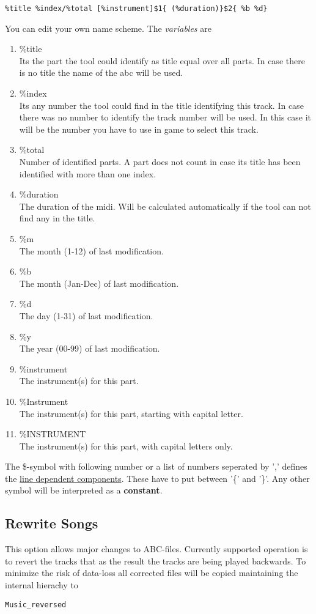 \documentclass[10pt,a4paper,oneside]{article}
\begin{document}
\begin{verbatim}
%title %index/%total [%instrument]$1{ (%duration)}$2{ %b %d}
\end{verbatim} You can edit your own name scheme. The \textit{variables} are \begin{enumerate}
\item[] \%title \\ Its the part the tool could identify as title equal over all parts. In case there is no title the name of the abc will be used.
\item[] \%index \\ Its any number the tool could find in the title identifying this track. In case there was no number to identify the track number will be used. In this case it will be the number you have to use in game to select this track.
\item[] \%total \\ Number of identified parts. A part does not count in case its title has been identified with more than one index.
\item[] \%duration \\ The duration of the midi. Will be calculated automatically if the tool can not find any in the title.
\item[] \%m \\ The month (1-12) of last modification.
\item[] \%b \\ The month (Jan-Dec) of last modification.
\item[] \%d \\ The day (1-31) of last modification.
\item[] \%y \\ The year (00-99) of last modification.
\item[] \%instrument \\ The instrument(s) for this part.
\item[] \%Instrument \\ The instrument(s) for this part, starting with capital letter.
\item[] \%INSTRUMENT \\ The instrument(s) for this part, with capital letters only.
\end{enumerate} The \$-symbol with following number or a list of numbers seperated by ',' defines the \underline{line dependent components}. These have to put between '\{' and '\}'. Any other symbol will be interpreted as a \textbf{constant}.

\subsection{Rewrite Songs}
This option allows major changes to ABC-files. Currently supported operation is to revert the tracks that as the result the tracks are being played backwards. To minimize the risk of data-loss all corrected files will be copied maintaining the internal hierachy to \begin{verbatim} 
Music_reversed
\end{verbatim}
\end{document}

